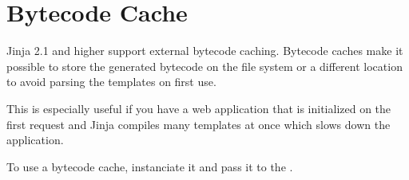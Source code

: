 \documentclass[a4paper,10pt,english]{sphinxmanual}
\begin{document}
\section{Bytecode Cache}
\label{api:bytecode-cache}\label{api:id2}
Jinja 2.1 and higher support external bytecode caching.  Bytecode caches make
it possible to store the generated bytecode on the file system or a different
location to avoid parsing the templates on first use.

This is especially useful if you have a web application that is initialized on
the first request and Jinja compiles many templates at once which slows down
the application.

To use a bytecode cache, instanciate it and pass it to the {\hyperref[api:jinja2.Environment]{}}.
\end{document}

